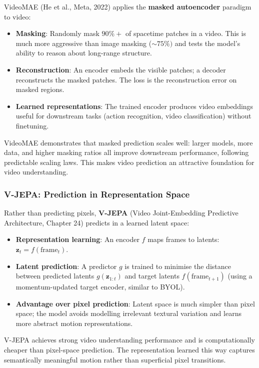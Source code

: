 VideoMAE (He et al., Meta, 2022) applies the \textbf{masked autoencoder} paradigm to video:
\begin{itemize}
  \item \textbf{Masking}: Randomly mask $90\%+$ of spacetime patches in a video. This is much more aggressive than image masking ($\sim 75\%)$ and tests the model's ability to reason about long-range structure.
  \item \textbf{Reconstruction}: An encoder embeds the visible patches; a decoder reconstructs the masked patches. The loss is the reconstruction error on masked regions.
  \item \textbf{Learned representations}: The trained encoder produces video embeddings useful for downstream tasks (action recognition, video classification) without finetuning.
\end{itemize}

VideoMAE demonstrates that masked prediction scales well: larger models, more data, and higher masking ratios all improve downstream performance, following predictable scaling laws. This makes video prediction an attractive foundation for video understanding.

\subsubsection{V-JEPA: Prediction in Representation Space}

Rather than predicting pixels, \textbf{V-JEPA} (Video Joint-Embedding Predictive Architecture, Chapter 24) predicts in a learned latent space:
\begin{itemize}
  \item \textbf{Representation learning}: An encoder $f$ maps frames to latents: $\mathbf{z}_t = f(\text{frame}_t)$.
  \item \textbf{Latent prediction}: A predictor $g$ is trained to minimise the distance between predicted latents $g(\mathbf{z}_{1:t})$ and target latents $f(\text{frame}_{t+1})$ (using a momentum-updated target encoder, similar to BYOL).
  \item \textbf{Advantage over pixel prediction}: Latent space is much simpler than pixel space; the model avoids modelling irrelevant textural variation and learns more abstract motion representations.
\end{itemize}

V-JEPA achieves strong video understanding performance and is computationally cheaper than pixel-space prediction. The representation learned this way captures semantically meaningful motion rather than superficial pixel transitions.

